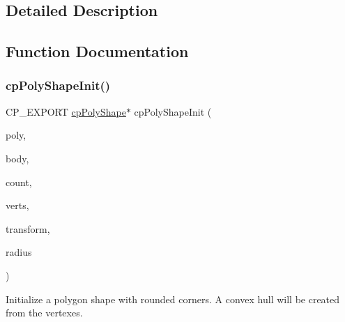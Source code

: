 \subsection{Detailed Description}


\subsection{Function Documentation}
\mbox{\label{group__cp_poly_shape_gac95c2ffa0beb4d7d328612e8f6198745}} 
\subsubsection{\texorpdfstring{cp\+Poly\+Shape\+Init()}{cpPolyShapeInit()}}
{\footnotesize\ttfamily C\+P\+\_\+\+E\+X\+P\+O\+RT \mbox{\hyperlink{structcp_poly_shape}{cp\+Poly\+Shape}}$\ast$ cp\+Poly\+Shape\+Init (\begin{DoxyParamCaption}\item[{\mbox{\hyperlink{structcp_poly_shape}{cp\+Poly\+Shape}} $\ast$}]{poly,  }\item[{\mbox{\hyperlink{structcp_body}{cp\+Body}} $\ast$}]{body,  }\item[{int}]{count,  }\item[{const \mbox{\hyperlink{structcp_vect}{cp\+Vect}} $\ast$}]{verts,  }\item[{\mbox{\hyperlink{structcp_transform}{cp\+Transform}}}]{transform,  }\item[{\mbox{\hyperlink{group__basic_types_gac1ed65573e035bf892505768c852d8d3}{cp\+Float}}}]{radius }\end{DoxyParamCaption})}

Initialize a polygon shape with rounded corners. A convex hull will be created from the vertexes. \mbox{\label{group__cp_poly_shape_gab38d2c0190ee256f8723adde83c8ccb6}} 
